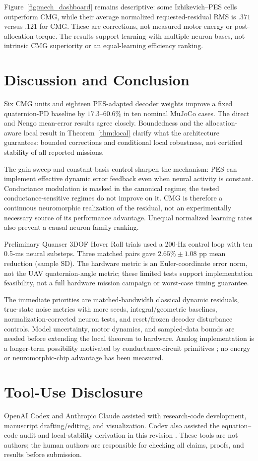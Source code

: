 \documentclass[letterpaper, 10 pt, conference]{ieeeconf}
\begin{document}
Figure~\ref{fig:mech_dashboard} remains descriptive: some Izhikevich--PES
cells outperform CMG, while their average normalized requested-residual
RMS is $.371$ versus $.121$ for CMG. These are corrections, not measured
motor energy or post-allocation torque. The results support learning with
multiple neuron bases, not intrinsic CMG superiority or an equal-learning
efficiency ranking.



\section{Discussion and Conclusion}
\label{sec:conclusion}
Six CMG units and eighteen PES-adapted decoder weights improve a fixed
quaternion-PD baseline by $17.3$--$60.6\%$ in ten nominal MuJoCo cases.
The direct and Nengo mean-error results agree closely. Boundedness and
the allocation-aware local result in Theorem~\ref{thm:local} clarify
what the architecture guarantees: bounded corrections and conditional
local robustness, not certified stability of all reported missions.

The gain sweep and constant-basis control sharpen the mechanism:
PES can implement effective dynamic error feedback even when neural
activity is constant. Conductance modulation is masked in the canonical
regime; the tested conductance-sensitive regimes do not improve on it.
CMG is therefore a continuous neuromorphic realization of the residual,
not an experimentally necessary source of its performance advantage.
Unequal normalized learning rates also prevent a causal neuron-family ranking.

Preliminary Quanser 3DOF Hover Roll trials used a 200-Hz control loop
with ten 0.5-ms neural substeps. Three matched pairs gave
$2.65\%\pm1.08$ pp mean reduction (sample SD). The hardware metric is
an Euler-coordinate error norm, not the UAV quaternion-angle metric;
these limited tests support implementation feasibility, not a full
hardware mission campaign or worst-case timing guarantee.

The immediate priorities are matched-bandwidth classical dynamic residuals,
true-state noise metrics with more seeds, integral/geometric baselines,
normalization-corrected neuron tests, and reset/frozen decoder disturbance
controls. Model uncertainty, motor dynamics, and
sampled-data bounds are needed before extending the local theorem to
hardware. Analog implementation is a longer-term possibility motivated
by conductance-circuit primitives \cite{mahowald1991vlsi}; no energy or
neuromorphic-chip advantage has been measured.

\section*{Tool-Use Disclosure}
OpenAI Codex and Anthropic Claude assisted with research-code development,
manuscript drafting/editing, and visualization. Codex also assisted the
equation--code audit and local-stability derivation in this revision
\cite{openaiCodexTool,anthropicClaudeTool}. These tools are not authors;
the human authors are responsible for checking all claims, proofs, and
results before submission.



\end{document}
